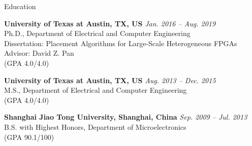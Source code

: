

\begin{rSection}{Education}


{\bf University of Texas at Austin, TX, US} \hfill {\em Jan. 2016 -- Aug. 2019} \\ 
Ph.D., Department of Electrical and Computer Engineering \\
Dissertation: Placement Algorithms for Large-Scale Heterogeneous FPGAs \\
Advisor: David Z. Pan \\
(GPA 4.0/4.0) 

{\bf University of Texas at Austin, TX, US} \hfill {\em Aug. 2013 -- Dec. 2015} \\ 
M.S., Department of Electrical and Computer Engineering \\
(GPA 4.0/4.0) 

{\bf Shanghai Jiao Tong University, Shanghai, China} \hfill {\em Sep. 2009 -- Jul. 2013} \\ 
B.S. with Highest Honors, Department of Microelectronics \\
(GPA 90.1/100)

\end{rSection}

